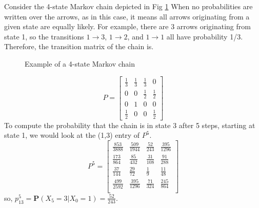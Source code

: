 \begin{example}
    Consider the 4-state
    Markov chain depicted in Fig \ref{4-step transition matrix example} When no probabilities are written over the
    arrows, as in this case, it means all arrows originating from a given state are equally
    likely. For example, there are 3 arrows originating from state 1, so the transitions
    $1 \to 3$, $1 \to 2$, and $1 \to 1$ all have probability 1/3. Therefore, the transition matrix of the chain is.

    \begin{figure}[ht]
        \centering
        \caption{Example of a 4-state Markov chain}
        \label{4-step transition matrix example}
    \end{figure}

    \[
        P=
        \begin{bmatrix}
            \frac{1}{3} & \frac{1}{3} & \frac{1}{3} & 0 \\
            0 & 0 & \frac{1}{2} & \frac{1}{2} \\ 
            0 & 1 & 0 & 0 \\ 
            \frac{1}{2} & 0 & 0 & \frac{1}{2} 
        \end{bmatrix}
    \]
    To compute the probability that the chain is in state 3 after 5 steps, starting at
    state 1, we would look at the (1,3) entry of $ P^{5} $.
    \[
        P^5 =
        \begin{bmatrix}
            \frac{853}{3888} & \frac{509}{1944} & \frac{52}{243} & \frac{395}{1296} \\
            \frac{173}{864} & \frac{85}{432} & \frac{31}{108} & \frac{91}{288} \\
            \frac{37}{144} & \frac{29}{72} & \frac{1}{9} & \frac{11}{48} \\
            \frac{499}{2592} & \frac{395}{1296} & \frac{71}{324} & \frac{245}{864} \\
        \end{bmatrix}
    \]
    so, $ p^{5}_{13}=\mathbf{P}(X_{5}=3|X_{0}=1) = \frac{52}{243} $.
\end{example}


